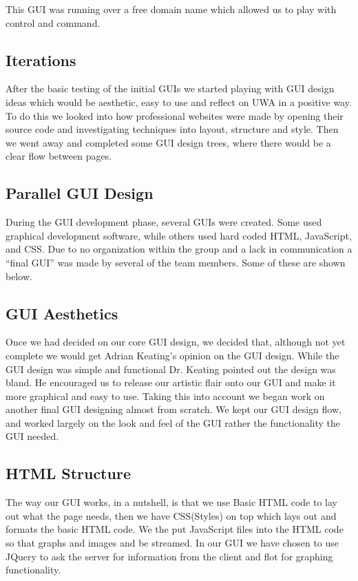 This GUI was running over a free domain name which allowed us to play with control and command. 

\subsection{Iterations}

After the basic testing of the initial GUIs we started playing with GUI design ideas which would be aesthetic, easy to use and reflect on UWA in a positive way.  To do this we looked into how professional websites were made by opening their source code and investigating techniques into layout, structure and style. Then we went away and completed some GUI design trees, where there would be a clear flow between pages.  

\subsection{Parallel GUI Design}

During the GUI development phase, several GUIs were created. Some used graphical development software, while others used hard coded HTML, JavaScript, and CSS.  Due to no organization within the group and a lack in communication a ``final GUI'' was made by several of the team members.  Some of these are shown below.

\subsection{GUI Aesthetics}

Once we had decided on our core GUI design, we decided that, although not yet complete we would get Adrian Keating's opinion on the GUI design. While the GUI design was simple and functional Dr. Keating pointed out the design was bland. He encouraged us to release our artistic flair onto our GUI and make it more graphical and easy to use. Taking this into account we began work on another final GUI designing almost from scratch. We kept our GUI design flow, and worked largely on the look and feel of the GUI rather the functionality the GUI needed. 

\subsection{HTML Structure}

The way our GUI works, in a nutshell, is that we use Basic HTML code to lay out what the page needs, then we have CSS(Styles) on top which lays out and formats the basic HTML code. We the put JavaScript files into the HTML code so that graphs and images and be streamed. In our GUI we have chosen to use JQuery to ask the server for information from the client and flot for graphing functionality. 

